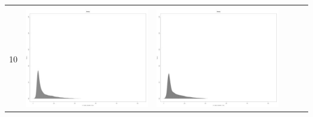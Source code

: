 \begin{table}[htbp]
{\begin{tabular}{l | ccccc}
\begin{minipage}{.15\textwidth}
    				 \end{minipage}\\			
		10	   & \begin{minipage}{.15\textwidth}\vspace{2pt}     							
     			 	\includegraphics[width=\linewidth]{images/mema-dens-graph/I2}
    				\end{minipage}
    			   & \begin{minipage}{.15\textwidth}\vspace{2pt}     							
     			 	\includegraphics[width=\linewidth]{images/mema-dens-graph/I6}
    				 \end{minipage}\\		

\end{tabular}}
\end{table}
